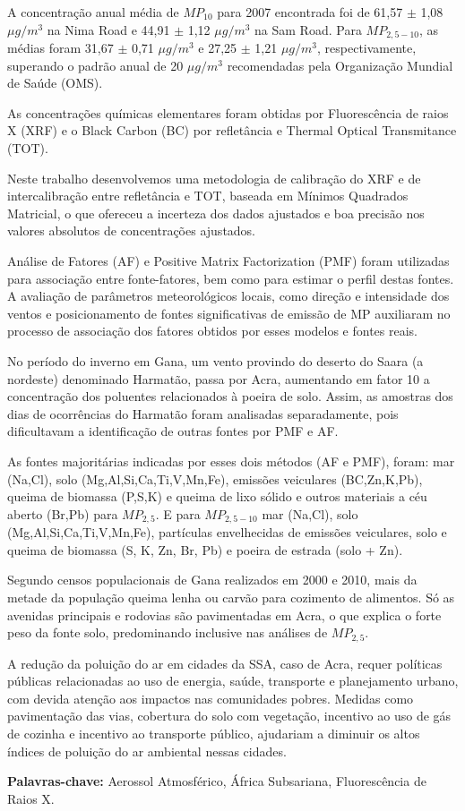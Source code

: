 A concentração anual média de $MP_{10}$ para 2007 encontrada foi de 
61,57 $\pm$ 1,08 $\mu g/m^3$ na Nima Road e 44,91 $\pm$ 1,12 $\mu g/m^3$ na 
Sam Road. Para $MP_{2,5-10}$, as médias foram 31,67 $\pm$ 0,71 $\mu g/m^3$ e 
27,25 $\pm$ 1,21 $\mu g/m^3$, respectivamente, superando o padrão anual de 20 
$\mu g/m^3$ recomendadas pela Organização Mundial de Saúde (OMS). 

As concentrações químicas elementares foram obtidas por 
Fluorescência de raios X (XRF) e o Black Carbon (BC) por 
refletância e Thermal Optical Transmitance (TOT). 

Neste trabalho desenvolvemos uma metodologia de calibração do XRF 
e de intercalibração entre refletância e TOT, baseada em Mínimos Quadrados 
Matricial, o que ofereceu a incerteza dos dados ajustados e boa precisão nos 
valores absolutos de concentrações ajustados.

Análise de Fatores (AF) e Positive Matrix Factorization (PMF) foram utilizadas
para associação entre fonte-fatores, bem como para estimar o perfil destas fontes. 
A avaliação de parâmetros meteorológicos locais, como direção e intensidade 
dos ventos e posicionamento de fontes significativas de emissão de MP 
auxiliaram no processo de associação dos fatores obtidos por esses modelos e 
fontes reais. 

No período do inverno em Gana, um vento provindo do deserto do Saara 
(a nordeste) denominado Harmatão, passa por Acra, aumentando em fator 10 a 
concentração dos poluentes relacionados à poeira de solo. Assim, as amostras 
dos dias de ocorrências do Harmatão foram analisadas separadamente, pois 
dificultavam a identificação de outras fontes por PMF e AF.

As fontes majoritárias indicadas por esses dois métodos (AF e PMF), 
foram: mar (Na,Cl), solo (Mg,Al,Si,Ca,Ti,V,Mn,Fe), emissões veiculares 
(BC,Zn,K,Pb), queima de biomassa (P,S,K) e queima de lixo sólido e outros 
materiais a céu aberto (Br,Pb) para $MP_{2,5}$. 
E para $MP_{2,5-10}$ mar (Na,Cl), solo (Mg,Al,Si,Ca,Ti,V,Mn,Fe), partículas 
envelhecidas de emissões veiculares, solo e queima de biomassa 
(S, K, Zn, Br, Pb) e poeira de estrada (solo + Zn).

Segundo censos populacionais de Gana realizados em 2000 e 2010, 
mais da metade da população queima lenha ou carvão para cozimento 
de alimentos. Só as avenidas principais e rodovias são pavimentadas em Acra, 
o que explica o forte peso da fonte solo, predominando 
inclusive nas análises de $MP_{2,5}$.

A redução da poluição do ar em cidades da SSA, caso de Acra, 
requer políticas públicas relacionadas ao uso de energia, saúde, 
transporte e planejamento urbano, com devida atenção 
aos impactos nas comunidades pobres. 
Medidas como pavimentação das vias, cobertura do solo com vegetação, 
incentivo ao uso de gás de cozinha e incentivo ao transporte público, 
ajudariam a diminuir os altos índices de poluição do ar ambiental 
nessas cidades.

\par
\vspace{1em}
\noindent\textbf{Palavras-chave:}  Aerossol Atmosférico, África Subsariana, Fluorescência de Raios X.
